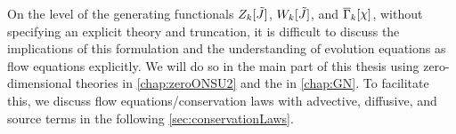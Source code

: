 On the level of the \rgscaledependent{} generating functionals $Z_k[\tilde{J}]$, $W_k[\tilde{J}]$, and $\FSeaa_k[\FSmf{\FSsf}]$, without specifying an explicit theory and truncation, it is difficult to discuss the implications of this formulation and the understanding of \rg{} evolution equations as flow equations explicitly. 
We will do so in the main part of this thesis using zero-dimensional theories in \cref{chap:zeroONSU2} and the \gnm{} in \cref{chap:GN}.
To facilitate this, we discuss flow equations/conservation laws with advective, diffusive, and source terms in the following \cref{sec:conservationLaws}.
